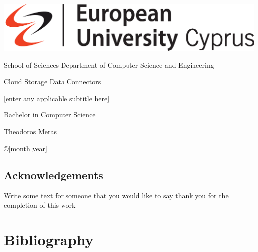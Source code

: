 \documentclass[12pt,a4paper]{report}
\begin{document}
	
	\thispagestyle{empty}
	{
		
		\noindent\includegraphics[scale=0.32]{images/euc}
		
		
		\begin{center}
			School of Sciences \textbar \; Department of Computer Science and Engineering
		\end{center}
		
		\vspace{1.5cm}
		\begin{center}
			\Huge  Cloud Storage Data Connectors
		\end{center}
		
		
		\vspace{0.2cm}
		\begin{center}
			\Large [enter any applicable subtitle here]
		\end{center}
		
		\vspace{1.5cm}
		\begin{center}\LARGE Bachelor in Computer Science
		\end{center}
		
		
		\vspace{1.5cm}
		\begin{center}
			\Large Theodoros Meras
		\end{center}
		\vspace{1.5cm}
		
		\noindent
		\begin{center}\copyright  [month year]
		\end{center}
		\newpage
		\thispagestyle{empty}
		
	}%
	
	\section*{Acknowledgements}
	Write some text for someone that you would like to say thank you for the completion of this work
	
	\newpage
	
	
	\newpage
	
	
	
	
	
	
	
	\chapter*{Bibliography}
	
	
	
	
\end{document}
